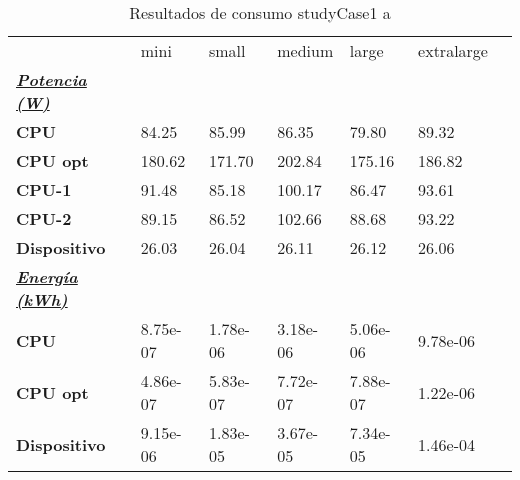 \begin{table}[H]
    \centering
    \begin{tabular}{lllllll}
    \rowcolor[HTML]{DAE8FC} \ & mini & small & medium & 	large & 	extralarge \\
    \cellcolor[HTML]{DAE8FC} \textbf{\textbf{{\emph{{\underline{{Potencia (W)}}}}}}} &  &  &  & 	 & 	 \\
    \rowcolor[HTML]{EFEFEF} \cellcolor[HTML]{DAE8FC} \textbf{CPU} & 84.25 & 85.99 & 86.35 & 	79.80 & 	89.32 \\
    \cellcolor[HTML]{DAE8FC} \textbf{CPU opt} & 180.62 & 171.70 & 202.84 & 	175.16 & 	186.82 \\
    \rowcolor[HTML]{EFEFEF} \cellcolor[HTML]{DAE8FC} \textbf{\quad CPU-1} & 91.48 & 85.18 & 100.17 & 	86.47 & 	93.61 \\
    \cellcolor[HTML]{DAE8FC} \textbf{\quad CPU-2} & 89.15 & 86.52 & 102.66 & 	88.68 & 	93.22 \\
    \rowcolor[HTML]{EFEFEF} \cellcolor[HTML]{DAE8FC} \textbf{Dispositivo} & 26.03 & 26.04 & 26.11 & 	26.12 & 	26.06 \\
    \cellcolor[HTML]{DAE8FC} \textbf{\textbf{{\emph{{\underline{{Energía (kWh)}}}}}}} &  &  &  & 	 & 	 \\
    \rowcolor[HTML]{EFEFEF} \cellcolor[HTML]{DAE8FC} \textbf{CPU} & 8.75e-07 & 1.78e-06 & 3.18e-06 & 	5.06e-06 & 	9.78e-06 \\
    \cellcolor[HTML]{DAE8FC} \textbf{CPU opt} & 4.86e-07 & 5.83e-07 & 7.72e-07 & 	7.88e-07 & 	1.22e-06 \\
    \rowcolor[HTML]{EFEFEF} \cellcolor[HTML]{DAE8FC} \textbf{Dispositivo} & 9.15e-06 & 1.83e-05 & 3.67e-05 & 	7.34e-05 & 	1.46e-04 \\
    \end{tabular}
    \caption[Resultados de consumo studyCase1 a]{{Resultados de consumo studyCase1 a}}
    \label{table_test_studyCase1_a_hw_powerResults}
\end{table}